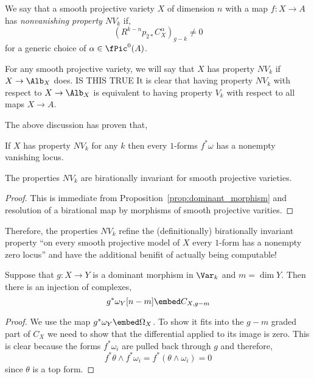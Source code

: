 \documentclass[12pt]{article}
\begin{document}
\begin{defn}
We say that a smooth projective variety $X$ of dimension $n$ with a map $f : X \to A$ has \textit{nonvanishing property $NV_k$} if,
\[ (R^{k-n} p_{2*} C_X^\alpha)_{g-k} \neq 0 \]
for a generic choice of $\alpha \in \fPic^0(A)$.
\end{defn}

\begin{rmk}
For any smooth projective variety, we will say that $X$ has property $NV_k$ if $X \to \Alb_X$ does. {\color{red} IS THIS TRUE It is clear that having property $NV_k$ with respect to $X \to \Alb_X$ is equivalent to having property $V_k$ with respect to all maps $X \to A$.} 
\end{rmk}

The above discussion has proven that,

\begin{prop}
If $X$ has property $NV_k$ for any $k$ then every $1$-forms $f^* \omega$ has a nonempty vanishing locus. 
\end{prop}

\begin{prop}
The properties $NV_k$ are birationally invariant for smooth projective varieties.
\end{prop}

\begin{proof}
This is immediate from Proposition~\ref{prop:dominant_morphism} and resolution of a birational map by morphisms of smooth projective varities.
\end{proof}

\begin{rmk}
Therefore, the properties $NV_k$ refine the (definitionally) birationally invariant property ``on every smooth projective model of $X$ every $1$-form has a nonempty zero locus'' and have the additional benifit of actually being computable!
\end{rmk}

\begin{lemma}
Suppose that $g : X \to Y$ is a dominant morphism in $\Var_k$ and $m = \dim{Y}$. Then there is an injection of complexes,
\[ g^* \omega_Y[n-m] \embed C_{X,g-m} \]
\end{lemma}

\begin{proof}
We use the map $g^* \omega_Y \embed \Omega_{X}$. To show it fits into the $g-m$ graded part of $C_X$ we need to show that the differential applied to its image is zero. This is clear because the forms $f^* \omega_i$ are pulled back through $g$ and therefore,
\[ f^* \theta \wedge f^* \omega_i = f^* (\theta \wedge \omega_i) = 0 \]
since $\theta$ is a top form. 
\end{proof}
\end{document}
